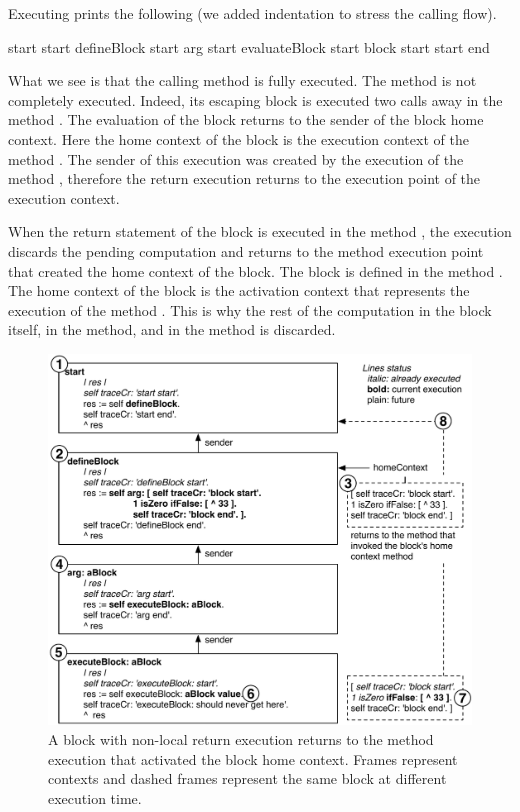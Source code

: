 \documentclass[a4paper,10pt,twoside]{book}
\begin{document}
Executing   prints the following (we added indentation to stress the calling flow).

\begin{code}{}
start start
   defineBlock start
      arg start
         evaluateBlock start
            block start
start end
\end{code}

What we see is that the calling method  is fully executed. The method  is not completely executed. Indeed, its escaping block \ct{[^33]} is executed two calls away in the method . The evaluation of the block returns to the sender of the block home context. Here the home context of the block is the execution context of the method . The sender of this execution was created by the execution of the method , therefore the return execution returns to the execution point of the  execution context.

When the return statement of the block is executed in the method , the execution discards the pending computation and returns to the method execution point that created the home context of the block. The block is defined in  the method . The home context of the block is the activation context that represents the execution of the method . This is why the rest of the computation in the block itself, in the  method, and in the  method is discarded.

\begin{figure}
\begin{center}\includegraphics[width=\textwidth]{nonLocalReturn2}
\caption{A block with non-local return execution returns to the method execution that activated the block home context. Frames represent contexts and dashed frames represent the same block at different execution time.\label{nonLocalReturn}}
\end{center}
\end{figure}
\end{document}
